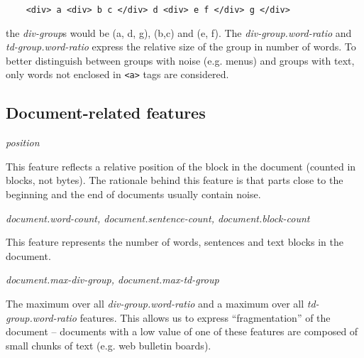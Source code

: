 \documentclass[12pt,a4paper, fleqn, leqno, twoside]{article}
\newcommand{\mysubsection}[1]{\subsection*{\bf #1}}
\begin{document}
\begin{description}
\begin{verbatim}
    <div> a <div> b c </div> d <div> e f </div> g </div>
\end{verbatim}

the {\it div-group}s would be (a, d, g), (b,c) and (e, f). The {\it
div-group.word-ratio} and {\it td-group.word-ratio} express the
relative size of the group in number of words. To better distinguish
between groups with noise (e.g. menus) and groups with text, only words
not enclosed in {\tt <a>} tags are considered.


\end{description}

\mysubsection{Document-related features}

\begin{description}

\item{\it position}

This feature reflects a relative position of the block in the document
(counted in blocks, not bytes). The rationale behind this feature is
that parts close to the beginning and the end of documents usually
contain noise.

\item{\it document.word-count, document.sentence-count, document.block-count}

This feature represents the number of words, sentences and text blocks in the
document. 

\item{\it document.max-div-group, document.max-td-group}

The maximum over all {\it div-group.word-ratio} and a maximum over all
{\it td-group.word-ratio} features. This allows us to express
``fragmentation'' of the document -- documents with a low value of one of these features are composed of small chunks of text (e.g. web bulletin boards).

\end{description}
\end{document}

